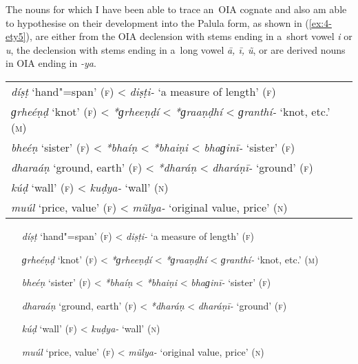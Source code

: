 The nouns for which I have been able to trace an~OIA cognate and also am able to hypothesise on their development into the Palula form, as shown in (\ref{ex:4-ety5}), are either from the OIA declension with stems ending in a~short vowel \textit{i} or \textit{u}, the declension with stems ending in a~long vowel \textit{ā, ī, ũ}, or are derived nouns in OIA ending in \textit{-ya}.


\begin{exe}
\extab
\label{ex:4-ety5}
\begin{tabular}{ l }
\textit{díṣṭ} `hand"=span' (\textsc{f}) {\textless} \textit{diṣṭi-} `a measure of length' (\textsc{f})\\
\textit{ɡrheéṇḍ} `knot' (\textsc{f}) {\textless} \textit{*ɡrheeṇḍí} {\textless} \textit{*ɡraaṇḍhí} {\textless} \textit{ɡranthí-} `knot, etc.' (\textsc{m})\\
\textit{bheéṇ} `sister' (\textsc{f}) {\textless} \textit{*bhaíṇ} {\textless} \textit{*bhaiṇi} {\textless} \textit{bhaɡinī-} `sister' (\textsc{f})\\
\textit{dharaáṇ} `ground, earth' (\textsc{f}) {\textless} \textit{*dharáṇ} {\textless} \textit{dharáṇī-} `ground' (\textsc{f})\\
\textit{kúḍ} `wall' (\textsc{f}) {\textless} \textit{kuḍya-} `wall' (\textsc{n})\\
\textit{muúl} `price, value' (\textsc{f}) {\textless} \textit{mũlya-} `original value, price' (\textsc{n})
\end{tabular}
\end{exe}


\begin{itemize}[itemsep=0pt, leftmargin=]
\item[\textit{díṣṭ} `hand"=span' (\textsc{f})] {\textless} \textit{diṣṭi-} `a measure of length' (\textsc{f})
\item[\textit{ɡrheéṇḍ} `knot' (\textsc{f})] {\textless} \textit{*ɡrheeṇḍí} {\textless} \textit{*ɡraaṇḍhí} {\textless} \textit{ɡranthí-} `knot, etc.' (\textsc{m})
\item[\textit{bheéṇ} `sister' (\textsc{f})] {\textless} \textit{*bhaíṇ} {\textless} \textit{*bhaiṇi} {\textless} \textit{bhaɡinī-} `sister' (\textsc{f})
\item[\textit{dharaáṇ} `ground, earth' (\textsc{f})] {\textless} \textit{*dharáṇ} {\textless} \textit{dharáṇī-} `ground' (\textsc{f})
\item[\textit{kúḍ} `wall' (\textsc{f})] {\textless} \textit{kuḍya-} `wall' (\textsc{n})
\item[\textit{muúl} `price, value' (\textsc{f})] {\textless} \textit{mũlya-} `original value, price' (\textsc{n})
\end{itemize}

